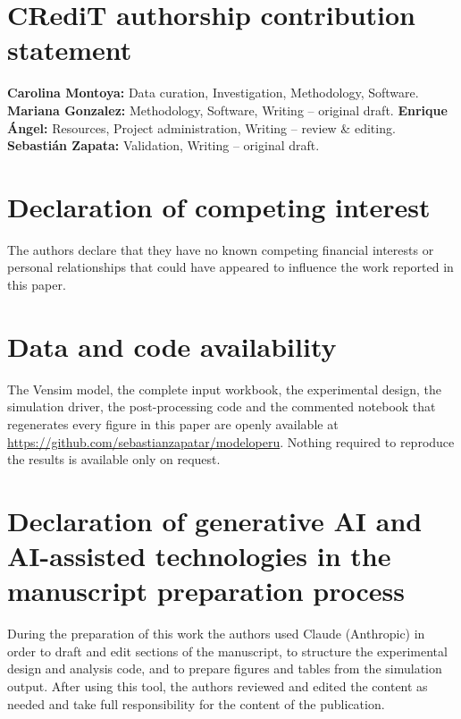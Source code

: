 \documentclass[preprint,3p,times,11pt]{elsarticle}
\begin{document}








\section*{CRediT authorship contribution statement}
\textbf{Carolina Montoya:} Data curation, Investigation, Methodology, Software.
\textbf{Mariana Gonzalez:} Methodology, Software, Writing -- original draft.
\textbf{Enrique Ángel:} Resources, Project administration, Writing -- review \&
editing.
\textbf{Sebastián Zapata:} Validation, Writing -- original draft.

\section*{Declaration of competing interest}
The authors declare that they have no known competing financial interests or
personal relationships that could have appeared to influence the work reported in
this paper.

\section*{Data and code availability}
The Vensim model, the complete input workbook, the experimental design, the
simulation driver, the post-processing code and the commented notebook that
regenerates every figure in this paper are openly available at
\url{https://github.com/sebastianzapatar/modeloperu}.
Nothing required to reproduce the results is available only on request.

\section*{Declaration of generative AI and AI-assisted technologies in the
manuscript preparation process}
During the preparation of this work the authors used Claude (Anthropic) in order to
draft and edit sections of the manuscript, to structure the experimental design and
analysis code, and to prepare figures and tables from the simulation output. After
using this tool, the authors reviewed and edited the content as needed and take full
responsibility for the content of the publication.



\end{document}
